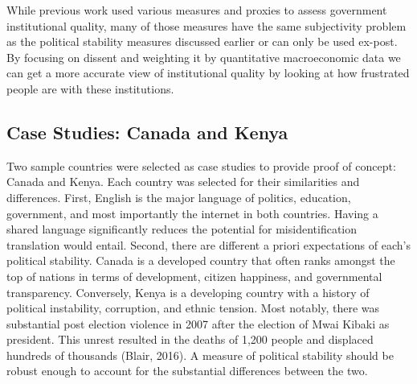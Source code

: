\documentclass[12pt]{article}
\begin{document}
\begin{spacing}{1.5}



While previous work used various measures and proxies to assess government institutional quality, many of those measures have the same subjectivity problem as the political stability measures discussed earlier or can only be used ex-post. By focusing on dissent and weighting it by quantitative macroeconomic data we can get a more accurate view of institutional quality by looking at how frustrated people are with these institutions. 





\subsection*{Case Studies: Canada and Kenya}

Two sample countries were selected as case studies to provide proof of concept: Canada and Kenya. Each country was selected for their similarities and differences. First, English is the major language of politics, education, government, and most importantly the internet in both countries. Having a shared language significantly reduces the potential for misidentification translation would entail. Second, there are different a priori expectations of each’s political stability. Canada is a developed country that often ranks amongst the top of nations in terms of development, citizen happiness, and governmental transparency. Conversely, Kenya is a developing country with a history of political instability, corruption, and ethnic tension. Most notably, there was substantial post election violence in 2007 after the election of Mwai Kibaki as president. This unrest resulted in the deaths of 1,200 people and displaced hundreds of thousands (Blair, 2016). A measure of political stability should be robust enough to account for the substantial differences between the two.  


\end{spacing}
\end{document}
